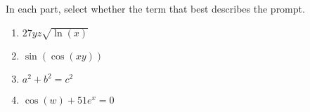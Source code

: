 \documentclass{ximera}
\author{Kenneth Berglund}
\begin{document}
\begin{exercise}
In each part, select whether the term that best describes the prompt.

\begin{enumerate}
\item $27yz\sqrt{\ln(x)}$
\begin{multipleChoice}
\end{multipleChoice}

\item $\sin(\cos(xy))$
\begin{multipleChoice}
\end{multipleChoice}

\item $a^2 + b^2 = c^2$
\begin{multipleChoice}
\end{multipleChoice}

\item $\cos(w) + 51e^x = 0$
\begin{multipleChoice}
\end{multipleChoice}

\end{enumerate}

\end{exercise}
\end{document}
